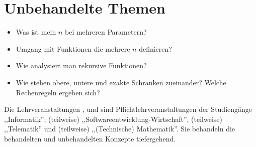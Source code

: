 \section{Unbehandelte Themen}
%
\begin{itemize}
  \item Was ist mein $n$ bei mehreren Parametern?
  \item Umgang mit Funktionen die mehrere $n$ definieren?
  \item Wie analysiert man rekursive Funktionen?
  \item Wie stehen obere, untere und exakte Schranken zueinander? Welche Rechenregeln ergeben sich?
\end{itemize}
%
Die Lehrveranstaltungen \coursedaa{}, \coursetcs{} und \coursedaa{} sind Pflichtlehrveranstaltungen der Studiengänge ,,Informatik'', (teilweise) ,,Softwareentwicklung-Wirtschaft'', (teilweise) ,,Telematik'' und (teilweise) ,,(Technische) Mathematik''. Sie behandeln die behandelten und unbehandelten Konzepte tiefergehend.
